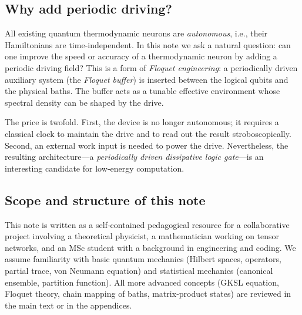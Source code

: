 \documentclass[11pt,a4paper]{article}
\theoremstyle{definition}
\theoremstyle{remark}
\begin{document}
\subsection{Why add periodic driving?}
All existing quantum thermodynamic neurons are \emph{autonomous}, i.e., their Hamiltonians are time‑independent. In this note we ask a natural question: can one improve the speed or accuracy of a thermodynamic neuron by adding a periodic driving field? This is a form of \emph{Floquet engineering}: a periodically driven auxiliary system (the \emph{Floquet buffer}) is inserted between the logical qubits and the physical baths. The buffer acts as a tunable effective environment whose spectral density can be shaped by the drive.

The price is twofold. First, the device is no longer autonomous; it requires a classical clock to maintain the drive and to read out the result stroboscopically. Second, an external work input is needed to power the drive. Nevertheless, the resulting architecture---a \emph{periodically driven dissipative logic gate}---is an interesting candidate for low‑energy computation.

\subsection{Scope and structure of this note}
This note is written as a self‑contained pedagogical resource for a collaborative project involving a theoretical physicist, a mathematician working on tensor networks, and an MSc student with a background in engineering and coding. We assume familiarity with basic quantum mechanics (Hilbert spaces, operators, partial trace, von Neumann equation) and statistical mechanics (canonical ensemble, partition function). All more advanced concepts (GKSL equation, Floquet theory, chain mapping of baths, matrix‑product states) are reviewed in the main text or in the appendices.
\end{document}
